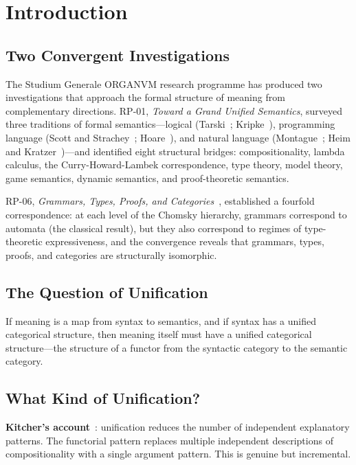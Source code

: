 \documentclass[12pt,a4paper]{article}
\begin{document}
\section{Introduction}

\subsection{Two Convergent Investigations}

The Studium Generale ORGANVM research programme has produced two
investigations that approach the formal structure of meaning from
complementary directions. RP-01, \emph{Toward a Grand Unified Semantics},
surveyed three traditions of formal semantics---logical (Tarski~\cite{Tarski1936};
Kripke~\cite{Kripke1959,Kripke1963}), programming language
(Scott and Strachey~\cite{ScottStrachey1971}; Hoare~\cite{Hoare1969}), and
natural language (Montague~\cite{Montague1973};
Heim and Kratzer~\cite{HeimKratzer1998})---and identified eight structural
bridges: compositionality, lambda calculus, the Curry-Howard-Lambek
correspondence, type theory, model theory, game semantics, dynamic semantics,
and proof-theoretic semantics.

RP-06, \emph{Grammars, Types, Proofs, and Categories}~\cite{Padavano2026RP06},
established a fourfold correspondence: at each level of the Chomsky hierarchy,
grammars correspond to automata (the classical result), but they also
correspond to regimes of type-theoretic expressiveness, and the convergence
reveals that grammars, types, proofs, and categories are structurally
isomorphic.

\subsection{The Question of Unification}

If meaning is a map from syntax to semantics, and if syntax has a unified
categorical structure, then meaning itself must have a unified categorical
structure---the structure of a functor from the syntactic category to the
semantic category.

\subsection{What Kind of Unification?}

\textbf{Kitcher's account}~\cite{Kitcher1981}: unification reduces the number
of independent explanatory patterns. The functorial pattern replaces multiple
independent descriptions of compositionality with a single argument pattern.
This is genuine but incremental.
\end{document}
